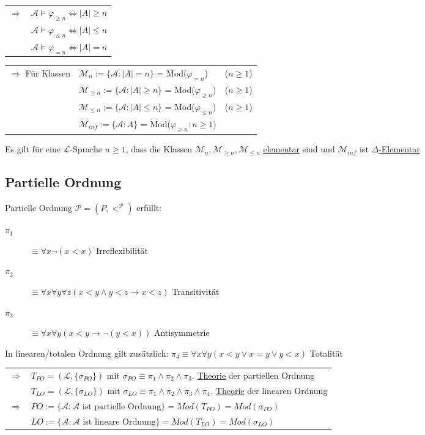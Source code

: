 \documentclass[12pt,a4paper]{article} %
\begin{document}
	\begin{tabular}{l l}
		$\Rightarrow$ & $\mathcal{A} \hyperref[Erfullbar]{\vDash} \varphi_{\ge n} \Leftrightarrow |A| \ge n$ \\
		& $\mathcal{A} \hyperref[Erfullbar]{\vDash} \varphi_{\le n} \Leftrightarrow |A| \le n$ \\
		& $\mathcal{A} \hyperref[Erfullbar]{\vDash} \varphi_{= n} \Leftrightarrow |A| = n$
	\end{tabular}

	\begin{tabular}{l l l}
		$\Rightarrow$ Für Klassen & $\mathcal{M}_n := \{\mathcal{A} : |A| = n\}$ = Mod($\varphi_{= n}$) & ($n \ge 1$) \\
		& $\mathcal{M}_{\ge n} := \{\mathcal{A} : |A| \ge n \}$ = Mod($\varphi_{\ge n}$) & ($n \ge 1$) \\
		& $\mathcal{M}_{\le n} := \{\mathcal{A} : |A| \le n\}$ = Mod($\varphi_{\le n}$) & ($n \ge 1$) \\
		& $\mathcal{M}_{inf} := \{\mathcal{A} : A\}$ = Mod($\varphi_{\ge n} : n \ge 1$) & \\
	\end{tabular}

	Es gilt für eine $\mathcal{L}$-Sprache $n \ge 1$, dass die Klassen $\mathcal{M}_n, \mathcal{M}_{\ge n}, \mathcal{M}_{\le n}$ \hyperref[Elementar]{elementar} sind und $\mathcal{M}_{inf}$ ist \hyperref[Elementar]{$\Delta$-Elementar}
	
	\subsection{Partielle Ordnung}
	Partielle Ordnung $\mathcal{P} = (P, <^{\mathcal{P}})$ erfüllt:
	\begin{description}
		\item[$\pi_1$] $\equiv \forall x \neg(x < x)$ Irreflexibilität
		\item[$\pi_2$] $\equiv \forall x \forall y \forall z (x < y \land y < z \rightarrow x < z)$ Transitivität
		\item[$\pi_3$] $\equiv \forall x \forall y (x < y \rightarrow \neg (y < x))$ Antisymmetrie
	\end{description}
	In linearen/totalen Ordnung gilt zusätzlich:\newline
	$\pi_4 \equiv \forall x \forall y (x < y \lor x = y \lor y < x)$ Totalität
	
	\begin{tabular}{l l}
		$\Rightarrow$ & $T_{PO} = (\mathcal{L}, \{\sigma_{PO}\})$ mit $\sigma_{PO} \equiv \pi_1 \land \pi_2 \land \pi_3$. \hyperref[Theorie]{Theorie} der partiellen Ordnung \\
		& $T_{LO} = (\mathcal{L}, \{\sigma_{LO}\})$ mit $\sigma_{LO} \equiv \pi_1 \land \pi_2 \land \pi_3 \land \pi_4$. \hyperref[Theorie]{Theorie} der linearen Ordnung \\
		$\Rightarrow$ & $PO := \{\mathcal{A}: \mathcal{A} \text{ ist partielle Ordnung}\} = Mod(T_{PO}) = Mod(\sigma_{PO})$ \\
		& $LO := \{\mathcal{A}: \mathcal{A} \text{ ist lineare Ordnung}\} = Mod(T_{LO}) = Mod(\sigma_{LO})$
	\end{tabular}
	
\end{document}
